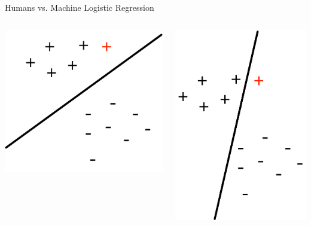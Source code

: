 \documentclass[aspectratio=169]{beamer}
\begin{document}
\begin{frame}{Humans vs. Machine Logistic Regression}

\begin{columns}
\begin{column}{0.5\textwidth}
\includegraphics[width=.85\textwidth]{lectSVM/logR1HumanAddPt.pdf}
\end{column}
\begin{column}{0.5\textwidth}
\includegraphics[width=.7\textwidth]{lectSVM/logR1addPt.pdf}
\end{column}
\end{columns}
\end{frame}
\end{document}
